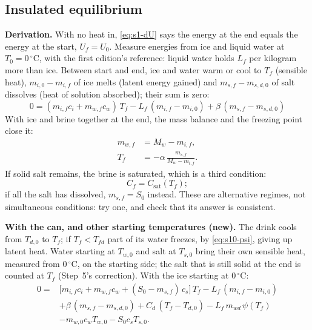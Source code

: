 \documentclass[11pt,a4paper]{article}
\newcommand{\dC}{\,{}^{\circ}\mathrm{C}}
\newcommand{\Csat}{C_{\mathrm{sat}}}
\newcommand{\Tfd}{T_{fd}}
\newcommand{\para}[1]{\par\smallskip\noindent\textbf{#1}\enspace}
\begin{document}
\subsection{Insulated equilibrium}
\para{Derivation.} With no heat in, \eqref{eq:s1-dU} says the energy at the end equals the energy at the
start, $U_f = U_0$. Measure energies from ice and liquid water at $T_0 = 0\dC$, with the first edition's
reference: liquid water holds $L_f$ per kilogram more than ice. Between start and end, ice and water warm
or cool to $T_f$ (sensible heat), $m_{i,0} - m_{i,f}$ of ice melts (latent energy gained) and
$m_{s,f} - m_{s,d,0}$ of salt dissolves (heat of solution absorbed); their sum is zero:
\begin{equation}
\boxed{\,0 = (m_{i,f}c_i + m_{w,f}c_w)\,T_f - L_f\,(m_{i,f} - m_{i,0}) + \beta\,(m_{s,f} - m_{s,d,0})\,} \label{eq:s12-insulated}
\end{equation}
With ice and brine together at the end, the mass balance and the freezing point close it:
\begin{align}
m_{w,f} &= M_w - m_{i,f}, \label{eq:s12-mw}\\
T_f &= -\alpha\,\frac{m_{s,f}}{M_w - m_{i,f}} . \label{eq:s12-Tf}
\end{align}
If solid salt remains, the brine is saturated, which is a third condition:
\begin{equation}
C_f = \Csat(T_f); \label{eq:s12-sat}
\end{equation}
if all the salt has dissolved, $m_{s,f} = S_0$ instead. These are alternative regimes, not simultaneous
conditions: try one, and check that its answer is consistent.

\para{With the can, and other starting temperatures (new).} The drink cools from $T_{d,0}$ to $T_f$; if
$T_f < \Tfd$ part of its water freezes, by \eqref{eq:s10-psi}, giving up latent heat. Water starting at
$T_{w,0}$ and salt at $T_{s,0}$ bring their own sensible heat, measured from $0\dC$, on the starting side; the
salt that is still solid at the end is counted at $T_f$ (Step~5's correction). With the ice starting at
$0\dC$:
\begin{equation}
\begin{split}
0 = {}&\big[m_{i,f}c_i + m_{w,f}c_w + (S_0 - m_{s,f})\,c_s\big]\,T_f - L_f\,(m_{i,f} - m_{i,0})\\
&+ \beta\,(m_{s,f} - m_{s,d,0}) + C_d\,(T_f - T_{d,0}) - L_f\,m_{wd}\,\psi(T_f)\\
&- m_{w,0}c_wT_{w,0} - S_0c_sT_{s,0} .
\end{split}
\label{eq:s12-can}
\end{equation}
\end{document}
